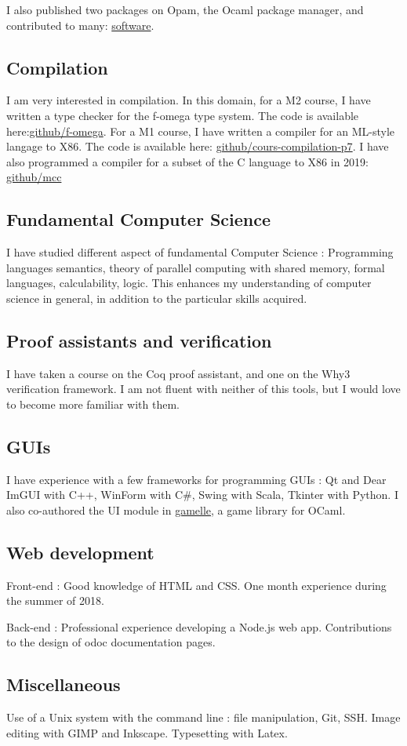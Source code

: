 \documentclass[10pt, a4paper, roman, french]{moderncv}
\begin{document}
I also published two packages on Opam, the Ocaml package manager, and contributed to many: \href{https://emiletrotignon.github.io/software}{software}.

	
		\subsection{Compilation}
			I am very interested in compilation. In this domain, for a M2 course, I have written a type checker for the f-omega type system. The code is available here:\href{https://github.com/EmileTrotignon/f-omega}{github/f-omega}.
For a M1 course, I have written a compiler for an ML-style langage to X86. The code is available here: \href{https://github.com/EmileTrotignon/cours-compilation-p7}{github/cours-compilation-p7}.
I have also programmed a compiler for a subset of the C language to X86 in 2019: \href{https://github.com/EmileTrotignon/mcc}{github/mcc}

	
		\subsection{Fundamental Computer Science}
			I have studied different aspect of fundamental Computer Science :
Programming languages semantics, theory of parallel computing with shared memory, formal languages, calculability, logic.
This enhances my understanding of computer science in general, in addition to the particular skills acquired.

	
		\subsection{Proof assistants and verification}
			I have taken a course on the Coq proof assistant, and one on the Why3 verification framework. I am not fluent with neither of this tools, but I would love to become more familiar with them.

	
		\subsection{GUIs}
			I have experience with a few frameworks for programming GUIs :
Qt and Dear ImGUI with C++, WinForm with C\#, Swing with Scala, Tkinter with Python.
I also co-authored the UI module in \href{https://github.com/art-w/gamelle/}{gamelle}, a game library for OCaml.

	
		\subsection{Web development}
			Front-end : Good knowledge of HTML and CSS. One month experience during the summer of 2018.

Back-end : Professional experience developing a Node.js web app. Contributions to the design of odoc documentation pages.

	
		\subsection{Miscellaneous}
			Use of a Unix system with the command line : file manipulation, Git, SSH.
Image editing with GIMP and Inkscape.
Typesetting with Latex.

	
\end{document}
